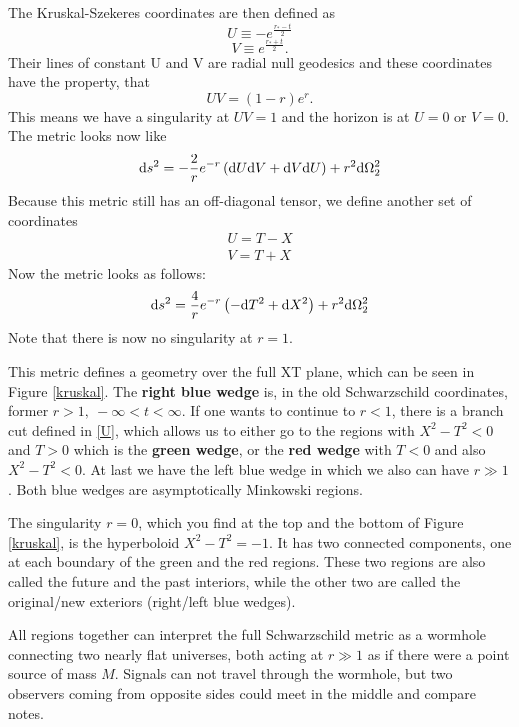 	The Kruskal-Szekeres coordinates are then defined as
		\begin{equation}
			U\equiv -e^{\frac{r_*-t}{2}} \label{U}
		\end{equation}
		\begin{equation}
			V\equiv e^{\frac{r_*+t}{2}}.
		\end{equation}
	Their lines of constant U and V are radial null geodesics and these coordinates have the property, that
		\begin{equation}
			 UV=(1-r)e^r.
		\end{equation}
	This means we have a singularity at $UV=1$ and the horizon is at $U=0$ or $V=0$. The metric looks now like
		\begin{equation}
			\mathrm{d} s^2=-\frac{2}{r}e^{-r}\left(\mathrm{d} U \mathrm{d} V + \mathrm{d} V \mathrm{d} U\right)+r^2 \mathrm{d} \Omega^2_{2}
		\end{equation}
	Because this metric still has an off-diagonal tensor, we define another set of coordinates
		\begin{equation}
		\begin{split}
			U=T-X 	\\	
			V=T+X
		\end{split}
		\end{equation}
	Now the metric looks as follows:
		\begin{equation}\label{SchXT}
			\mathrm{d} s^2=\frac{4}{r}e^{-r}\left(- \mathrm{d} T^2+ \mathrm{d} X^2\right)+r^2 \mathrm{d} \Omega^2_2
		\end{equation}
	Note that there is now no singularity at $r=1$.
	
	This metric defines a geometry over the full XT plane, which can be seen in Figure \ref{kruskal}. The \textbf{right {\color{blue} blue} wedge} is, in the old Schwarzschild coordinates, former $r>1,~-\infty<t<\infty$. If one wants to continue to $r<1$, there is a branch cut  defined in \eqref{U}, which allows us to either go to the regions with $X^2-T^2<0$ and $T>0$ which is the \textbf{{\color{forestgreen} green} wedge}, or the \textbf{{\color{red} red} wedge} with $T<0$ and also $X^2-T^2<0$. At last we have the left {\color{blue} blue} wedge in which we also can have $r\gg1$. Both blue wedges are asymptotically Minkowski regions. 
	
	The singularity $r=0$, which you find at the top and the bottom of Figure \ref{kruskal}, is the hyperboloid $X^2-T^2=-1$. It has two connected components, one at each boundary of the {\color{forestgreen} green} and the {\color{red} red} regions. These two regions are also called the {\color{forestgreen} future} and the {\color{red} past} interiors, while the other two are called the original/new exteriors (right/left {\color{blue} blue} wedges).
	
	All regions together can interpret the full Schwarzschild metric as a wormhole connecting two nearly flat universes, both acting at $r\gg1$ as if there were a point source of mass $M$. Signals can not travel through the wormhole, but two observers coming from opposite sides could meet in the middle and compare notes. 